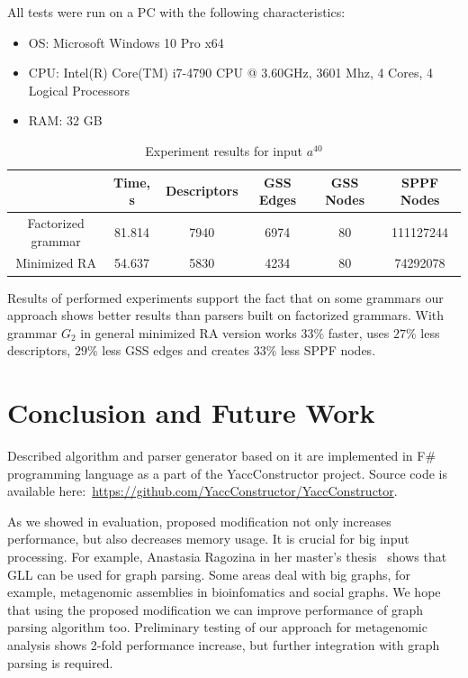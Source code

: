 \documentclass[runningheads,a4paper]{llncs}
\begin{document}
All tests were run on a PC with the following characteristics:
\begin{itemize}
    \item OS: Microsoft Windows 10 Pro x64
    \item CPU: Intel(R) Core(TM) i7-4790 CPU @ 3.60GHz, 3601 Mhz, 4 Cores, 4 Logical Processors
    \item RAM: 32 GB
\end{itemize}

\begin{table}[ht]   
\begin{center}
    \begin{tabular}{ | c | c | c | c | c | c | }
        \hline
                           & Time, s & Descriptors & GSS Edges & GSS Nodes & SPPF Nodes   \\ \hline
        Factorized grammar & 81.814  & 7940        & 6974      & 80        & 111127244  \\ \hline
        Minimized RA       & 54.637  & 5830        & 4234      & 80        & 74292078  \\ \hline
    \end{tabular}
\end{center}
\caption{Experiment results for input $a^{40}$}
\label{expTable}
\end{table}



Results of performed experiments support the fact that on some grammars our approach shows better results than parsers built on factorized grammars.
With grammar $G_2$ in general minimized RA version works $33\%$ faster, uses $27\%$ less descriptors, $29\%$ less GSS edges and creates $33\%$ less SPPF nodes.

\section{Conclusion and Future Work}

Described algorithm and parser generator based on it are implemented in F\# programming language as a part of the YaccConstructor project.
Source code is available here:~\url{https://github.com/YaccConstructor/YaccConstructor}.

As we showed in evaluation, proposed modification not only increases performance, but also decreases memory usage. 
It is crucial for big input processing.
For example, Anastasia Ragozina in her master's thesis~\cite{ragozina} shows that GLL can be used for graph parsing.  
Some areas deal with big graphs, for example, metagenomic assemblies in bioinfomatics and social graphs.
We hope that using the proposed modification we can improve performance of graph parsing algorithm too. 
Preliminary testing of our approach for metagenomic analysis shows 2-fold performance increase, but further integration with graph parsing is required.
\end{document}
